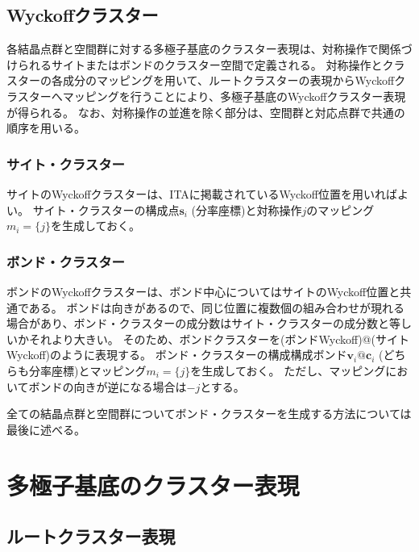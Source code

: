 \documentclass[11pt]{easymemo}
\begin{document}
\subsection{Wyckoffクラスター}

各結晶点群と空間群に対する多極子基底のクラスター表現は、対称操作で関係づけられるサイトまたはボンドのクラスター空間で定義される。
対称操作とクラスターの各成分のマッピングを用いて、ルートクラスターの表現からWyckoffクラスターへマッピングを行うことにより、多極子基底のWyckoffクラスター表現が得られる。
なお、対称操作の並進を除く部分は、空間群と対応点群で共通の順序を用いる。

\subsubsection{サイト・クラスター}

サイトのWyckoffクラスターは、ITAに掲載されているWyckoff位置を用いればよい。
サイト・クラスターの構成点$\bm{s}_{i}$ (分率座標)と対称操作$j$のマッピング$m_{i}=\{j\}$を生成しておく。

\subsubsection{ボンド・クラスター}
ボンドのWyckoffクラスターは、ボンド中心についてはサイトのWyckoff位置と共通である。
ボンドは向きがあるので、同じ位置に複数個の組み合わせが現れる場合があり、ボンド・クラスターの成分数はサイト・クラスターの成分数と等しいかそれより大きい。
そのため、ボンドクラスターを(ボンドWyckoff)@(サイトWyckoff)のように表現する。
ボンド・クラスターの構成構成ボンド$\bm{v}_{i}@\bm{c}_{i}$ (どちらも分率座標)とマッピング$m_{i}=\{j\}$を生成しておく。
ただし、マッピングにおいてボンドの向きが逆になる場合は$-j$とする。

全ての結晶点群と空間群についてボンド・クラスターを生成する方法については最後に述べる。


\section{多極子基底のクラスター表現}

\subsection{ルートクラスター表現}
\end{document}
